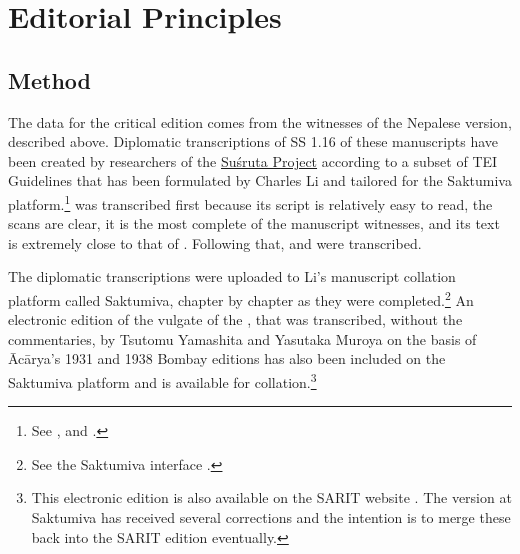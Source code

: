 
\section{Editorial Principles}
\subsection{Method}

The data for the critical edition comes from the witnesses of the Nepalese
version, described above. Diplomatic transcriptions of SS 1.16 of these
manuscripts have been created by researchers of the
\href{https://sushrutaproject.org}{Suśruta Project} according to a subset of
TEI Guidelines that has been formulated by Charles Li and tailored for the
Saktumiva platform.\footnote{See \cite{wuja-2021c}, \cite{tei-p5} and \cite[
    “TEI Tagging”]{li-2017a}.}  was transcribed first
    because its script is relatively easy to read, the scans are clear, it is the
    most complete of the manuscript witnesses, and its text is extremely close to
    that of . Following that, 
    and  were transcribed.

The diplomatic transcriptions were uploaded to Li's manuscript collation
platform called Saktumiva, chapter by chapter as they were
completed.\footnote{See the Saktumiva interface \cite{li-2017a}.} An
    electronic edition of the vulgate of the \SS, that was transcribed, without
    the commentaries, by Tsutomu Yamashita and Yasutaka Muroya on the basis of
    Ācārya's 1931 and 1938 Bombay editions has also been included on the Saktumiva
    platform and is available for collation.\footnote{This electronic edition is
        also available on the SARIT website \citep[sub “Suśrutasaṃhitā”]{wuja-2008}. The 
        version at
        Saktumiva has received several corrections and the intention is to merge these
        back into the SARIT edition eventually.}

